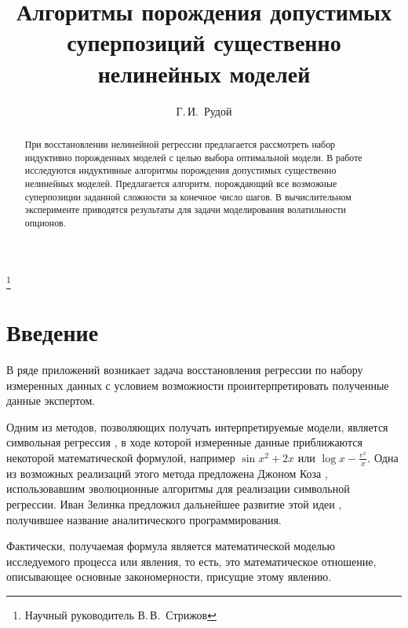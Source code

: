 \documentclass[12pt,a4paper]{amsart}
\begin{document}
\pagestyle{plain}

\title{Алгоритмы порождения допустимых суперпозиций существенно нелинейных моделей}
\author{Г.\,И.~Рудой}
\address{Московский физико-технический институт, ФУПМ, каф. <<Интеллектуальные системы>>}
\thanks{Научный руководитель В.\,В.~Стрижов}

\begin{abstract}
  При восстановлении нелинейной регрессии предлагается рассмотреть набор
  индуктивно порожденных моделей с целью выбора оптимальной модели. В работе
  исследуются индуктивные алгоритмы порождения допустимых существенно
  нелинейных моделей. Предлагается алгоритм, порождающий все возможные
  суперпозиции заданной сложности за конечное число шагов. В вычислительном
  эксперименте приводятся результаты для задачи моделирования волатильности
  опционов.
\end{abstract}

\maketitle

\section{Введение}

В ряде приложений \cite{Barmpalexis201175} \cite{Shi:2011:CRM}
\cite{DOI:10.1504/IJCENT.2010.038358} возникает задача восстановления
регрессии по набору измеренных данных с условием возможности проинтерпретировать
полученные данные экспертом.

Одним из методов, позволяющих получать интерпретируемые модели, является
символьная регрессия \cite{davidson:2000:snrea} \cite{reference/ml/X10vc},
в ходе которой измеренные данные приближаются
некоторой математической формулой, например $ \sin x^2 + 2x $ или
$\log x - \frac{e^x}{x} $. Одна из возможных реализаций этого метода
предложена Джоном Коза \cite{Koza1998GP} \cite{Koza1998Intro}, использовавшим
эволюционные алгоритмы для реализации символьной регрессии. Иван Зелинка
предложил дальнейшее развитие этой идеи \cite{Zelinka2008}, получившее
название аналитического программирования.

Фактически, получаемая формула является математической моделью
\cite{Pavlovsky2000} исследуемого процесса или явления, то есть, это
математическое отношение, описывающее основные закономерности, присущие этому
явлению.
\end{document}
